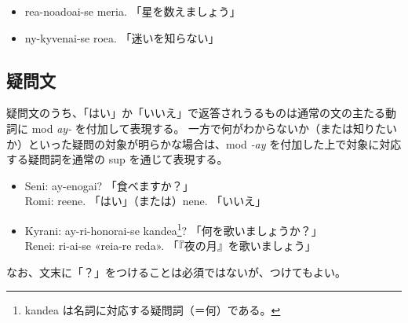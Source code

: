 \begin{itemize}
    \item rea-noadoai-se meria. 「星を数えましょう」
    \item ny-kyvenai-se roea. 「迷いを知らない」
\end{itemize}

\subsection{疑問文}

疑問文のうち、「はい」か「いいえ」で返答されうるものは通常の文の主たる動詞に mod \emph{ay-} を付加して表現する。
一方で何がわからないか（または知りたいか）といった疑問の対象が明らかな場合は、mod \emph{-ay} を付加した上で対象に対応する疑問詞を通常の sup を通じて表現する。

\begin{itemize}
    \item Seni: ay-enogai? 「食べますか？」 \\ Romi: reene. 「はい」（または）nene. 「いいえ」
    \item Kyrani: ay-ri-honorai-se kandea\footnote{kandea は名詞に対応する疑問詞（＝何）である。}? 「何を歌いましょうか？」\\ Renei: ri-ai-se «reia-re reda». 「『夜の月』を歌いましょう」
\end{itemize}

なお、文末に「？」をつけることは必須ではないが、つけてもよい。